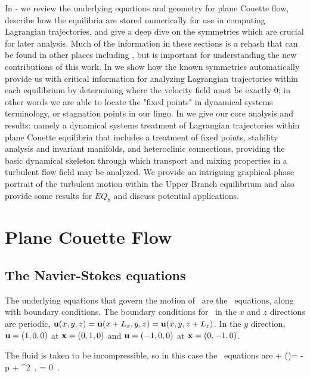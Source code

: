 \documentclass[letter,12pt,openany]{article}
\begin{document}
 In - we review the underlying equations and geometry for plane Couette flow, describe how the equilibria are stored numerically for use in computing Lagrangian trajectories, and give a deep dive on the symmetries which are crucial for later analysis. Much of the information in these sections is a rehash that can be found in other places including \cite{GHCW07}, but is important for understanding the new contributions of this work.  In  we show how the known symmetries automatically provide us with critical information for analyzing Lagrangian trajectories within each equilibrium by determining where the velocity field must be exactly 0; in other words we are able to locate the "fixed points" in dynamical systems terminology, or stagnation points in our lingo. In  we give our core analysis and results: namely a dynamical systems treatment of Lagrangian trajectories within plane Couette equilibria that includes a treatment of fixed points, stability analysis and invariant manifolds, and heteroclinic connections, providing the basic dynamical skeleton through which transport and mixing properties in a turbulent flow field may be analyzed. We provide an intriguing graphical phase portrait of the turbulent motion within the Upper Branch equilibrium and also provide some results for $EQ_8$ and discuss potential applications.





\section{\centering Plane Couette Flow}
\label{sec:PCF}

\subsection{The Navier-Stokes equations}
\label{sec:NS}
 The underlying equations
that govern the motion of \pCf\ are the \NS\ equations,
along with boundary conditions. The boundary conditions for \pCf\ in the $x$
and $z$ directions are periodic,
 $ {\bf u}(x, y, z) = {\bf u}(x+L_x, y, z) =
{\bf u}(x, y, z + L_z) $.
 In the $y$ direction,
 ${\bf u} = (1,0,0)$ at ${\bf x} = (0,1,0)$ and ${\bf u} = (-1,0,0)$ at ${\bf x} =
 (0,-1,0)$.

 The fluid is taken to be incompressible, so in this case the
 \NS\ equations are
 \beq
  + (\bu \cdot \nabla)\bu = -\nabla p +  \nabla^{2} \bu
    \,,\qquad
\nabla \cdot \bu  = 0 \,. \label{eqn:NavierStokes} \eeq 
\end{document}
